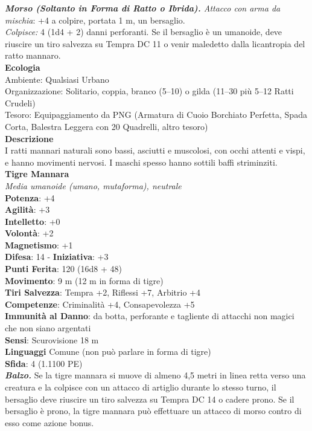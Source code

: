 \begin{multicols}{2}
\emph{\textbf{Morso (Soltanto in Forma di Ratto o Ibrida).} Attacco con arma da mischia}: +4 a colpire, portata 1 m, un bersaglio.\\

\emph{Colpisce:} 4 (1d4 + 2) danni perforanti. Se il bersaglio è un umanoide, deve riuscire un tiro salvezza su Tempra DC 11 o venir maledetto dalla licantropia del ratto mannaro.\\
\textbf{Ecologia}\\
Ambiente: Qualsiasi Urbano\\
Organizzazione: Solitario, coppia, branco (5–10) o gilda (11–30 più 5–12 Ratti Crudeli)\\
Tesoro: Equipaggiamento da PNG (Armatura di Cuoio Borchiato Perfetta, Spada Corta, Balestra Leggera con 20 Quadrelli, altro tesoro)\\
\textbf{Descrizione}\\
I ratti mannari naturali sono bassi, asciutti e muscolosi, con occhi attenti e vispi, e hanno movimenti nervosi. I maschi spesso hanno sottili baffi striminziti.\\

\medskip\textbf{Tigre Mannara}\\
\emph{Media umanoide (umano, mutaforma), neutrale}\\
\textbf{Potenza}: +4\\
\textbf{Agilità}: +3\\
\textbf{Intelletto}: +0\\
\textbf{Volontà}: +2\\
\textbf{Magnetismo}: +1\\
\textbf{Difesa}: 14 - \textbf{Iniziativa}: +3\\
\textbf{Punti Ferita}: 120 (16d8 + 48)\\
\textbf{Movimento}: 9 m (12 m in forma di tigre)\\
\textbf{Tiri Salvezza}: Tempra +2, Riflessi +7, Arbitrio +4\\
\textbf{Competenze}: Criminalità +4, Consapevolezza +5\\
\textbf{Immunità al Danno}: da botta, perforante e tagliente di attacchi non magici che non siano argentati\\
\textbf{Sensi}: Scurovisione 18 m\\
\textbf{Linguaggi} Comune (non può parlare in forma di tigre)\\
\textbf{Sfida}: 4 (1.1100 PE)\smallskip\\
\emph{\textbf{Balzo.}} Se la tigre mannara si muove di almeno 4,5 metri in linea retta verso una creatura e la colpisce con un attacco di artiglio durante lo stesso turno, il bersaglio deve riuscire un tiro salvezza su Tempra DC 14 o cadere prono. Se il bersaglio è prono, la tigre mannara può effettuare un attacco di morso contro di esso come azione bonus.\\


\end{multicols}
